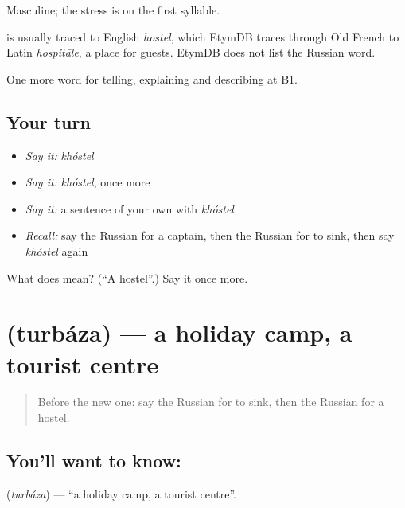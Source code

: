 Masculine; the stress is on the first syllable.

\begin{cousinweb}
\emph{} is usually traced to English \emph{hostel}, which EtymDB traces through Old French to Latin \emph{hospitāle}, a place for guests. EtymDB does not list the Russian word.
\end{cousinweb}

\begin{grammarlens}[title={What you've built}]
One more word for telling, explaining and describing at B1.
\end{grammarlens}

\subsection*{Your turn}
\begin{itemize}
\raggedright
  \item \emph{Say it:} \emph{khóstel}
  \item \emph{Say it:} \emph{khóstel}, once more
  \item \emph{Say it:} a sentence of your own with \emph{khóstel}
  \item \emph{Recall:} say the Russian for a captain, then the Russian for to sink, then say \emph{khóstel} again
\end{itemize}

\begin{tcolorbox}[breakable,colback=teal!4,colframe=teal!35!black,title={Before you move on}]
What does  mean? (\textquotedblleft{}A hostel\textquotedblright{}.) Say it once more.
\end{tcolorbox}
\section[\texorpdfstring{\ru{турбаза} (turbáza)}{турбаза (turbáza)}]{ (turbáza) — a holiday camp, a tourist centre}

\label{lesson:RU-C428-turbaza}



\begin{quote}
Before the new one: say the Russian for to sink, then the Russian for a hostel.
\end{quote}

\subsection*{You'll want to know: }
\textbf{} (\emph{turbáza}) — \textquotedblleft{}a holiday camp, a tourist centre\textquotedblright{}.

